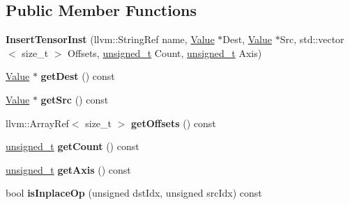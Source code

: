 \subsection*{Public Member Functions}
\begin{DoxyCompactItemize}
\item 
\mbox{\label{classglow_1_1_insert_tensor_inst_af37f9069f0cf9dc9f26cabda915dee32}} 
{\bfseries Insert\+Tensor\+Inst} (llvm\+::\+String\+Ref name, \hyperlink{classglow_1_1_value}{Value} $\ast$Dest, \hyperlink{classglow_1_1_value}{Value} $\ast$Src, std\+::vector$<$ size\+\_\+t $>$ Offsets, \hyperlink{namespaceglow_a0ca574644e1e42ef193a9947fb4d8911}{unsigned\+\_\+t} Count, \hyperlink{namespaceglow_a0ca574644e1e42ef193a9947fb4d8911}{unsigned\+\_\+t} Axis)
\item 
\mbox{\label{classglow_1_1_insert_tensor_inst_a4e6ad151bea70035d653e6d2d39064aa}} 
\hyperlink{classglow_1_1_value}{Value} $\ast$ {\bfseries get\+Dest} () const
\item 
\mbox{\label{classglow_1_1_insert_tensor_inst_a345a98521933ccee2985ba5f5302ca88}} 
\hyperlink{classglow_1_1_value}{Value} $\ast$ {\bfseries get\+Src} () const
\item 
\mbox{\label{classglow_1_1_insert_tensor_inst_ad74e7e82025381e338dea1a209dcaf08}} 
llvm\+::\+Array\+Ref$<$ size\+\_\+t $>$ {\bfseries get\+Offsets} () const
\item 
\mbox{\label{classglow_1_1_insert_tensor_inst_ae996db87e735bd27d00ee563f144ca56}} 
\hyperlink{namespaceglow_a0ca574644e1e42ef193a9947fb4d8911}{unsigned\+\_\+t} {\bfseries get\+Count} () const
\item 
\mbox{\label{classglow_1_1_insert_tensor_inst_a17f1d8b1fc6a788bbe73d686148fa377}} 
\hyperlink{namespaceglow_a0ca574644e1e42ef193a9947fb4d8911}{unsigned\+\_\+t} {\bfseries get\+Axis} () const
\item 
\mbox{\label{classglow_1_1_insert_tensor_inst_a3132cbdf82b8751b7a489b56eeb53f06}} 
bool {\bfseries is\+Inplace\+Op} (unsigned dst\+Idx, unsigned src\+Idx) const

\end{DoxyCompactItemize}
